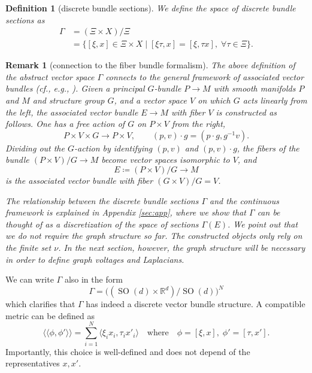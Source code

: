 \documentclass[10pt,reqno]{amsart}
\numberwithin{equation}{section}
\theoremstyle{bfnote}
\theoremstyle{bfdef}
\newtheorem{definition}[theorem]{Definition}
\newtheorem{remark}[theorem]{Remark}
\newcommand{\la}{\langle}
\newcommand{\ra}{\rangle}
\newcommand{\lla}{\langle\langle}
\newcommand{\rra}{\rangle\rangle}
\newcommand{\R}{\mathbb{R}}
\newcommand{\yyy}{}
\DeclareMathOperator{\SO}{SO}
\providecommand\x; %
\renewcommand{\x}{x}
\providecommand\X; %
\renewcommand{\X}{X}
\providecommand\gt; %
\renewcommand{\gt}{\xi}
\providecommand\gtt; %
\renewcommand{\gtt}{\tau}
\begin{document}
	\begin{definition}[discrete bundle sections\yyy]\label{def:discrete-bundles}
		We define the space of \textit{discrete bundle sections} as
		\begin{equation}\label{eq:def-Gamma}
			\begin{aligned}
				\Gamma
				&= (\Xi \times X) / \Xi \\
				&= \{ [\gt,\x ] \in \Xi \times \X \mid [\gt \gtt,\x ] = [\gt,\gtt \x ] ,\; \forall \gtt \in \Xi\}.
			\end{aligned}
		\end{equation}
	\end{definition}

	\begin{remark}[connection to the fiber bundle formalism]
		The above definition of the abstract vector space $\Gamma$ connects to the general framework of \textit{associated vector bundles} (cf., e.g., \cite[pp.~87-88]{Jost:2017aa}).
		Given a principal $G$-bundle $P\to M$ with smooth manifolds $P$ and $M$ and structure group $G$, and a vector space $V$ on which $G$ acts linearly from the left, the \textit{associated vector bundle} $E\to M$ with fiber $V$ is constructed as follows. One has a free action of $G$ on $P\times V$ from the right,
		\begin{equation}
			P\times V\times G \to P\times V,\qquad
			(p,v)\cdot g = (p\cdot g, g^{-1} v).
		\end{equation}
		Dividing out the $G$-action by identifying $(p,v)$ and $(p,v)\cdot g$, the fibers of the bundle $(P\times V)/G \to M$ become vector spaces isomorphic to $V$, and
		\begin{equation}
			E \coloneqq (P\times V)/G \to M
		\end{equation}
		is the associated vector bundle with fiber $(G\times V)/G = V$.

		The relationship between the discrete bundle sections $\Gamma$ and the continuous framework is explained in Appendix \ref{sec:app}, where we show that $\Gamma$ can be thought of as a discretization of the space of sections $\Gamma(E)$.
		We point out that we do not require the graph structure so far. The constructed objects only rely on the finite set $\nu$. In the next section, however, the graph structure will be necessary in order to define graph voltages and Laplacians.
	\end{remark}

	We can write $\Gamma$ also in the form
	\begin{equation}\label{eq:gamma}
		\Gamma = \big((\SO(d) \times \R^{d}) / \SO(d)\big)^N
	\end{equation}
	which clarifies that $\Gamma$ has indeed a discrete vector bundle structure. A compatible metric can be defined as
	\begin{equation}\label{eq:def-norm-gamma}
		\lla \phi , \phi ' \rra =
		\sum_{i=1}^N \la \gt_i \x_i, \gtt_i \x '_i \ra
		\quad \text{where} \quad
		\phi = [\gt,\x ],\; \phi' = [\gtt,\x '].
	\end{equation}
	Importantly, this choice is well-defined and does not depend of the representatives $\x ,\x '$.
\end{document}

